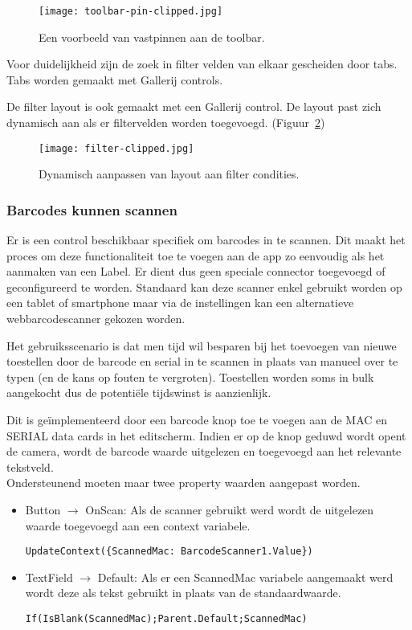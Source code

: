 \begin{figure}[h!]
    \texttt{[image: toolbar-pin-clipped.jpg]}
    \caption{Een voorbeeld van vastpinnen aan de toolbar.}
    \label{fig:toolbar-pin-clipped}
\end{figure}

Voor duidelijkheid zijn de zoek in filter velden van elkaar gescheiden door tabs. Tabs worden gemaakt met Gallerij controls.

De filter layout is ook gemaakt met een Gallerij control. De layout past zich dynamisch aan als er filtervelden worden toegevoegd. (Figuur~\ref{fig:filter-clipped})

\begin{figure}[h!]
    \texttt{[image: filter-clipped.jpg]}
    \caption{Dynamisch aanpassen van layout aan filter condities.}
    \label{fig:filter-clipped}
\end{figure}

\subsubsection{Barcodes kunnen scannen}

Er is een control beschikbaar specifiek om barcodes in te scannen. Dit maakt het proces om deze functionaliteit toe te voegen aan de app zo eenvoudig als het aanmaken van een Label. Er dient dus geen speciale connector toegevoegd of geconfigureerd te worden. Standaard kan deze scanner enkel gebruikt worden op een tablet of smartphone maar via de instellingen kan een alternatieve webbarcodescanner gekozen worden.

Het gebruiksscenario is dat men tijd wil besparen bij het toevoegen van nieuwe toestellen door de barcode en serial in te scannen in plaats van manueel over te typen (en de kans op fouten te vergroten). Toestellen worden soms in bulk aangekocht dus de potentiële tijdswinst is aanzienlijk.

Dit is geïmplementeerd door een barcode knop toe te voegen aan de MAC en SERIAL data cards in het editscherm. Indien er op de knop geduwd wordt opent de camera, wordt de barcode waarde uitgelezen en toegevoegd aan het relevante tekstveld.\\
Ondersteunend moeten maar twee property waarden aangepast worden.
\begin{itemize}
    \item Button $\rightarrow$ OnScan: Als de scanner gebruikt werd wordt de uitgelezen waarde toegevoegd aan een context variabele.
\begin{lstlisting}
UpdateContext({ScannedMac: BarcodeScanner1.Value})
\end{lstlisting}
    \item TextField $\rightarrow$ Default: Als er een ScannedMac variabele aangemaakt werd wordt deze als tekst gebruikt in plaats van de standaardwaarde.
\begin{lstlisting}
If(IsBlank(ScannedMac);Parent.Default;ScannedMac)
\end{lstlisting}    
\end{itemize}

